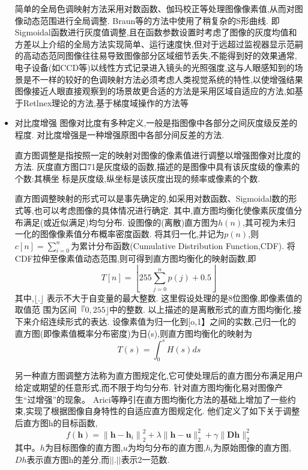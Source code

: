 \message{ !name(main.tex)}\documentclass{amsart}
\begin{document}
\begin{itemize}
简单的全局色调映射方法采用对数函数、伽玛校正等处理图像像素值,从而对图像动态范围进行全局调整.
Braun等的方法中使用了稍复杂的S形曲线.
即Sigmoidal函数进行灰度值调整,且在函数参数设置时考虑了图像的灰度均值和方差以上介绍的全局方法实现简单、运行速度快,但对于远超过监视器显示范嗣的高动态范同图像往往易导致图像部分区域细节丢失,不能得到好的效果通常,电子设备(如CCD等)以线性方式记录进入镜头的光照强度,这与人眼感知到的场景是不一样的较好的色调映射方法必须考虑人类视觉系统的特性,以使增强结果图像接近人眼直接观察到的场景故更合适的方法是采用区域自适应的方法,如基于Retlnex理论的方法,基于梯度域操作的方法等
\item 对比度增强
  图像对比度有多种定义,一般是指图像中各部分之间灰度级反差的程度.
  对比度增强是一种增强原图中各部分间反差的方法.


  直方图调整是指按照一定的映射对图像的像素值进行调整以增强图像对比度的方法.
  灰度直方图口71是灰度级的函数,描述的是图像中具有该灰度级的像素的个数:其横坐
  标是灰度级,纵坐标是该灰度出现的频率或像素的个数.


  直方图调整映射的形式可以是事先确定的,如采用对数函数、Sigmoidal数的形式等,也可以考虑图像的具体情况进行确定.
  其中,直方图均衡化使像素灰度值分布满足(或近似满足)均匀分布.
  设图像的(离散)直方图为$h(n)$,其可视为未归一化的图像像素值分布概率密度函数.
  将其归一化,并记为$p(n)$,则$c[n]=\sum_{i=0}^n$为累计分布函数(Cumulative Distribution Function,CDF).
  将CDF拉伸至像素值动态范围,则可得到直方图均衡化的映射函数,即
  \begin{equation}
    \label{eq:11}
    T[n]=\left\lfloor 255 \sum_{j=0}^{n} p(j)+0.5\right\rfloor
  \end{equation}
  其中,$\lfloor.\rfloor$ 表示不大于自变量的最大整数.
  这里假设处理的是8位图像,即像素值的取值范
  围为区间$『0,255\rfloor$中的整数.
  以上描述的是离散形式的直方图均衡化,接下来介绍连续形式的表达.
  设像素值为归一化到[o,1】之间的实数,己归一化的直方图(即像素值概率分布密度)为日(s),则直方图均衡化的映射为
  \begin{equation}
    \label{eq:12}
   T(s)=\int_{0}^s H(s) d s
  \end{equation}


  另一种直方图调整方法称为直方图规定化,它可使处理后的直方图分布满足用户给定或期望的任意形式,而不限于均匀分布.
  针对直方图均衡化易对图像产生“过增强”的现象。
  Arici等睁引在直方图均衡化方法的基础上增加了一些约束,实现了根据图像自身特性的自适应直方图规定化.
  他们定义了如下关于调整后直方图h的目标函数,
  \begin{equation}
    \label{eq:13}
    f(\boldsymbol{h})=\left\|\boldsymbol{h}-\boldsymbol{h}_{i}\right\|_{2}^{2}+\lambda\|\boldsymbol{h}-\boldsymbol{u}\|_{2}^{2}+\gamma\|\boldsymbol{D} \boldsymbol{h}\|_{2}^{2}
  \end{equation}
  其中。$h$为目标图像的直方图,$u$为均匀分布的直方图,$h_i$为原始图像的直方图,
  $Dh$表示直方图h的差分,而$||.||$表示2一范数.



\end{itemize}
\end{document}
